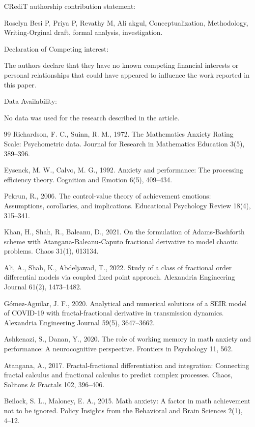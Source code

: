 \documentclass[10pt]{NSP1}
\begin{document}
CRediT authorship contribution statement:

Roselyn Besi P, Priya P, Revathy M, Ali akgul, Conceptualization, Methodology, Writing-Orginal draft, formal analysis, investigation.

Declaration of Competing interest:

The authors declare that they have no known competing financial interests or personal relationships that could have appeared to influence the work reported in this paper.

Data Availability:

No data was used for the research described in the article.

\begin{thebibliography}{99}
Richardson, F. C., Suinn, R. M., 1972. The Mathematics Anxiety Rating Scale: Psychometric data. Journal for Research in Mathematics Education 3(5), 389–396.

Eysenck, M. W., Calvo, M. G., 1992. Anxiety and performance: The processing efficiency theory. Cognition and Emotion 6(5), 409–434.

Pekrun, R., 2006. The control-value theory of achievement emotions: Assumptions, corollaries, and implications. Educational Psychology Review 18(4), 315–341.

Khan, H., Shah, R., Baleanu, D., 2021. On the formulation of Adams-Bashforth scheme with Atangana-Baleanu-Caputo fractional derivative to model chaotic problems. Chaos 31(1), 013134.

Ali, A., Shah, K., Abdeljawad, T., 2022. Study of a class of fractional order differential models via coupled fixed point approach. Alexandria Engineering Journal 61(2), 1473–1482.

Gómez-Aguilar, J. F., 2020. Analytical and numerical solutions of a SEIR model of COVID-19 with fractal-fractional derivative in transmission dynamics. Alexandria Engineering Journal 59(5), 3647–3662.

Ashkenazi, S., Danan, Y., 2020. The role of working memory in math anxiety and performance: A neurocognitive perspective. Frontiers in Psychology 11, 562.

Atangana, A., 2017. Fractal-fractional differentiation and integration: Connecting fractal calculus and fractional calculus to predict complex processes. Chaos, Solitons \& Fractals 102, 396–406.

Beilock, S. L., Maloney, E. A., 2015. Math anxiety: A factor in math achievement not to be ignored. Policy Insights from the Behavioral and Brain Sciences 2(1), 4–12.


\end{thebibliography}
\end{document}

